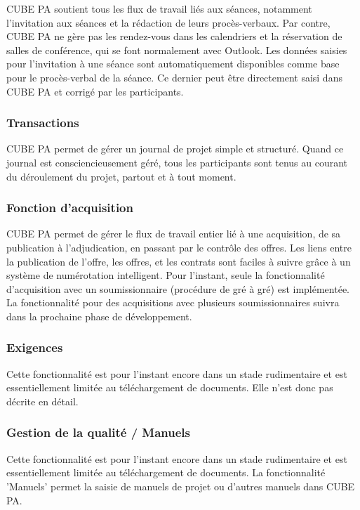 CUBE PA soutient tous les flux de travail liés aux séances, notamment l'invitation aux séances et la rédaction de leurs procès-verbaux. Par contre, CUBE PA ne gère pas les rendez-vous dans les calendriers et la réservation de salles de conférence, qui se font normalement avec Outlook. Les données saisies pour l'invitation à une séance sont automatiquement disponibles comme base pour le procès-verbal de la séance. Ce dernier peut être directement saisi dans CUBE PA et corrigé par les participants.

\subsubsection{Transactions}

CUBE PA permet de gérer un journal de projet simple et structuré. Quand ce journal est consciencieusement géré, tous les participants sont tenus au courant du déroulement du projet, partout et à tout moment.

\subsubsection{Fonction d'acquisition}

CUBE PA permet de gérer le flux de travail entier lié à une acquisition, de sa publication à l'adjudication, en passant par le contrôle des offres. Les liens entre la publication de l'offre, les offres, et les contrats sont faciles à suivre grâce à un système de numérotation intelligent. Pour l'instant, seule la fonctionnalité d'acquisition avec un soumissionnaire (procédure de gré à gré) est implémentée. La fonctionnalité pour des acquisitions avec plusieurs soumissionnaires suivra dans la prochaine phase de développement.

\subsubsection{Exigences}

Cette fonctionnalité est pour l'instant encore dans un stade rudimentaire et est essentiellement limitée au téléchargement de documents. Elle n'est donc pas décrite en détail.

\subsubsection{Gestion de la qualité / Manuels}

Cette fonctionnalité est pour l'instant encore dans un stade rudimentaire et est essentiellement limitée au téléchargement de documents. La fonctionnalité 'Manuels' permet la saisie de manuels de projet ou d'autres manuels dans CUBE PA.

